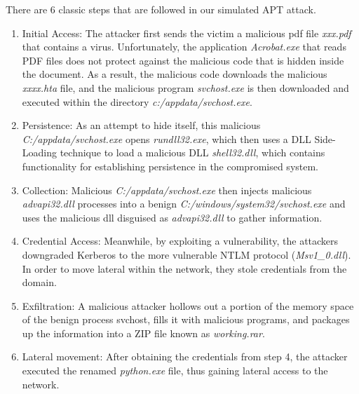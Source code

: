 
There are 6 classic steps that are followed in our simulated APT attack.
\begin{enumerate}[leftmargin=*]
    \item Initial Access: The attacker first sends the victim a malicious pdf file \textit{xxx.pdf} that contains a virus. Unfortunately, the application \textit{Acrobat.exe} that reads PDF files does not protect against the malicious code that is hidden inside the document. As a result, the malicious code downloads the malicious \textit{xxxx.hta} file, and the malicious program \textit{svchost.exe} is then downloaded and executed within the directory \textit{c:/appdata/svchost.exe}.
    \item Persistence: As an attempt to hide itself, this malicious \textit{C:/appdata/svchost.exe} opens \textit{rundll32.exe}, which then uses a DLL Side-Loading technique to load a malicious DLL \textit{shell32.dll}, which contains functionality for establishing persistence in the compromised system.
    \item Collection: Malicious \textit{C:/appdata/svchost.exe} then injects malicious \textit{advapi32.dll} processes into a benign \textit{C:/windows/system32/svchost.exe} and uses the malicious dll disguised as \textit{advapi32.dll} to gather information.
    \item Credential Access: Meanwhile, by exploiting a vulnerability, the attackers downgraded Kerberos to the more vulnerable NTLM protocol (\textit{Msv1\_0.dll}). In order to move lateral within the network, they stole credentials from the domain.
    \item Exfiltration: A malicious attacker hollows out a portion of the memory space of the benign process svchost, fills it with malicious programs, and packages up the information into a ZIP file known as \textit{working.rar}.
    \item Lateral movement: After obtaining the credentials from step 4, the attacker executed the renamed \textit{python.exe} file, thus gaining lateral access to the network.
\end{enumerate}




